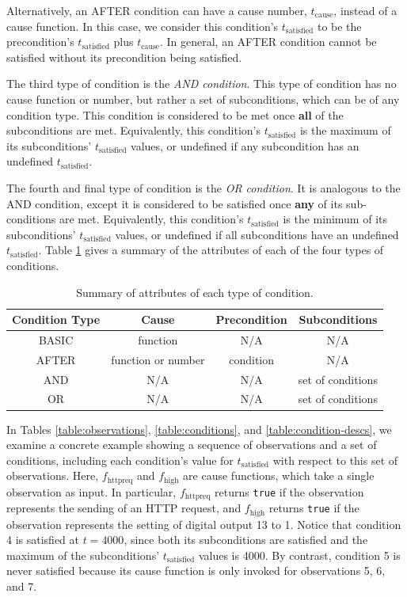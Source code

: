 \documentclass[12pt]{article}
\begin{document}
Alternatively, an AFTER condition can have a cause number, $t_{\text{cause}}$, instead of a cause function.  In this case, we consider this condition's $t_{\text{satisfied}}$ to be the precondition's $t_{\text{satisfied}}$ plus $t_{\text{cause}}$.  In general, an AFTER condition cannot be satisfied without its precondition being satisfied.

The third type of condition is the \textit{AND condition}.  This type of condition has no cause function or number, but rather a set of subconditions, which can be of any condition type.  This condition is considered to be met once \textbf{all} of the subconditions are met.  Equivalently, this condition's $t_{\text{satisfied}}$ is the maximum of its subconditions' $t_{\text{satisfied}}$ values, or undefined if any subcondition has an undefined $t_{\text{satisfied}}$.

The fourth and final type of condition is the \textit{OR condition}.  It is analogous to the AND condition, except it is considered to be satisfied once \textbf{any} of its sub-conditions are met. Equivalently, this condition's $t_{\text{satisfied}}$ is the minimum of its subconditions' $t_{\text{satisfied}}$ values, or undefined if all subconditions have an undefined $t_{\text{satisfied}}$.  Table \ref{table:condition-summary} gives a summary of the attributes of each of the four types of conditions.

\begin{table}[ht]
\begin{center}
\caption{Summary of attributes of each type of condition.}
\begin{tabular}{cccc}
Condition Type & Cause & Precondition & Subconditions \\ \hline
BASIC & function & N/A & N/A \\
AFTER & function or number & condition & N/A \\
AND & N/A & N/A & set of conditions \\
OR & N/A & N/A & set of conditions \\ \hline
\end{tabular}
\label{table:condition-summary}
\end{center}
\end{table}

\vspace{-5mm}

In Tables \ref{table:observations}, \ref{table:conditions}, and \ref{table:condition-descs}, we examine a concrete example showing a sequence of observations and a set of conditions, including each condition's value for $t_{\text{satisfied}}$ with respect to this set of observations.  Here, $f_{\text{httpreq}}$ and $f_{\text{high}}$ are cause functions, which take a single observation as input.  In particular, $f_{\text{httpreq}}$ returns \texttt{true} if the observation represents the sending of an HTTP request, and $f_{\text{high}}$ returns \texttt{true} if the observation represents the setting of digital output 13 to 1.  Notice that condition 4 is satisfied at $t=4000$, since both its subconditions are satisfied and the maximum of the subconditions' $t_{\text{satisfied}}$ values is 4000.  By contrast, condition 5 is never satisfied because its cause function is only invoked for observations 5, 6, and 7.
\end{document}
